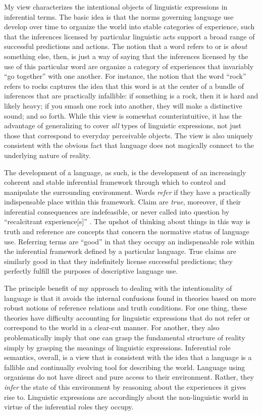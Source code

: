 My view characterizes the intentional objects of linguistic expressions in inferential terms. The basic idea is that the norms governing language use develop over time to organize the world into stable categories of experience, such that the inferences licensed by particular linguistic acts support a broad range of successful predictions and actions. The notion that a word refers to or is \textit{about} something else, then, is just a way of saying that the inferences licensed by the use of this particular word are organize a category of experiences that invariably ``go together'' with one another. For instance, the notion that the word ``rock'' refers to rocks captures the idea that this word is at the center of a bundle of inferences that are practically infallible: if something is a rock, then it is hard and likely heavy; if you smash one rock into another, they will make a distinctive sound; and so forth. While this view is somewhat counterintuitive, it has the advantage of generalizing to cover \textit{all} types of linguistic expressions, not just those that correspond to everyday perceivable objects. The view is also uniquely consistent with the obvious fact that language does not magically connect to the underlying nature of reality.

The development of a language, as such, is the development of an increasingly coherent and stable inferential framework through which to control and manipulate the surrounding environment. Words \textit{refer} if they have a practically indispensable place within this framework. Claim are \textit{true}, moreover, if their inferential consequences are indefeasible, or never called into question by ``recalcitrant experience[s]'' \citep[][p. 33]{Misak:2013}. The upshot of thinking about things in this way is truth and reference are concepts that concern the normative status of language use. Referring terms are ``good'' in that they occupy an indispensable role within the inferential framework defined by a particular language. True claims are similarly good in that they indefinitely license successful predictions; they perfectly fulfill the purposes of descriptive language use. 

The principle benefit of my approach to dealing with the intentionality of language is that it avoids the internal confusions found in theories based on more robust notions of reference relations and truth conditions. For one thing, these theories have difficulty accounting for linguistic expressions that do not refer or correspond to the world in a clear-cut manner. For another, they also problematically imply that one can grasp the fundamental structure of reality simply by grasping the meanings of linguistic expressions. Inferential role semantics, overall, is a view that is consistent with the idea that a language is a fallible and continually evolving tool for describing the world. Language using organisms do not have direct and pure access to their environment. Rather, they \textit{infer} the state of this environment by reasoning about the experiences it gives rise to. Linguistic expressions are accordingly about the non-linguistic world in virtue of the inferential roles they occupy. 

